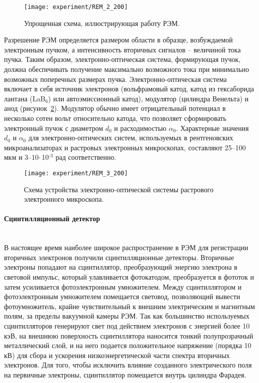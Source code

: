 \begin{figure}[t]
	\centering
	\texttt{[image: experiment/REM\_2\_200]}
	\caption{Упрощенная схема, иллюстрирующая работу РЭМ.}
	\label{fig:REM_2}
\end{figure}

Разрешение РЭМ определяется размером области в образце, возбуждаемой электронным пучком, а интенсивность вторичных сигналов --  величиной тока пучка. Таким образом, электронно-оптическая система, формирующая пучок, должна обеспечивать получение максимально возможного тока при минимально возможных поперечных размерах пучка. Электронно-оптическая система включает в себя источник электронов (вольфрамовый катод, катод из гексаборида лантана (LaB$_\text{6}$) или автоэмиссионный катод), модулятор (цилиндра Венельта) и анод (рисунок~\ref{fig:REM_3}). Модулятор обычно имеет отрицательный потенциал в несколько сотен вольт относительно катода, что позволяет сформировать электронный пучок с диаметром $d_0$ и расходимостью $\alpha_0$. Характерные значения $d_0$ и $\alpha_0$ для электронно-оптических систем, используемых в рентгеновских микроанализаторах и растровых электронных микроскопах, составляют 25--100 мкм и 3--10\:$\cdot$\,10$^\text{-3}$ рад соответственно.

\begin{figure}
	\centering
	\texttt{[image: experiment/REM\_3\_200]}
	\caption{Схема устройства электронно-оптической системы растрового электронного микроскопа.}
	\label{fig:REM_3}
\end{figure}

\paragraph{Сцинтилляционный детектор} \mbox{} \\
\indent В настоящее время наиболее широкое распространение в РЭМ для регистрации вторичных электронов получили сцинтилляционные детекторы. Вторичные электроны попадают на сцинтиллятор, преобразующий энергию электрона в световой импульс, который улавливается фотокатодом, преобразуется в фототок и затем усиливается фотоэлектронным умножителем. Между сцинтиллятором и фотоэлектронным умножителем помещается световод, позволяющий вывести фотоумножитель, крайне чувствительный к внешним электрическим и магнитным полям, за пределы вакуумной камеры РЭМ. Так как большинство используемых сцинтилляторов генерируют свет под действием электронов с энергией более 10 кэВ, на внешнюю поверхность сцинтиллятора наносится тонкий полупрозрачный металлический слой, и на него подается положительное напряжение (порядка 10 кВ) для сбора и ускорения низкоэнергетической части спектра вторичных электронов. Для того, чтобы исключить влияние созданного электрического поля на первичные электроны, сцинтиллятор помещается внутрь цилиндра Фарадея. 


